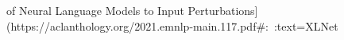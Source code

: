 of Neural Language Models to Input Perturbations](https://aclanthology.org/2021.emnlp-main.117.pdf#:~:text=XLNet%


